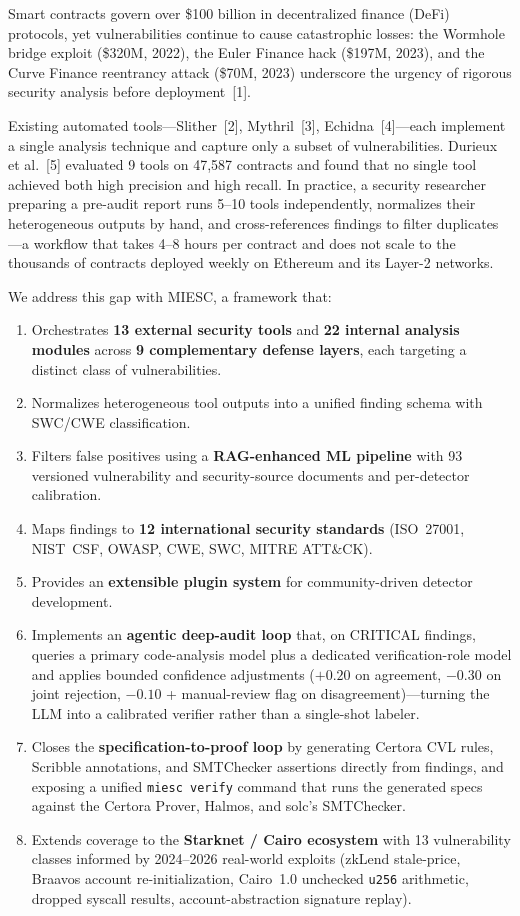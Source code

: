 \documentclass[conference]{IEEEtran}
\begin{document}
Smart contracts govern over \$100 billion in decentralized finance (DeFi) protocols, yet vulnerabilities continue to cause catastrophic losses: the Wormhole bridge exploit (\$320M, 2022), the Euler Finance hack (\$197M, 2023), and the Curve Finance reentrancy attack (\$70M, 2023) underscore the urgency of rigorous security analysis before deployment~[1].

Existing automated tools---Slither~[2], Mythril~[3], Echidna~[4]---each implement a single analysis technique and capture only a subset of vulnerabilities. Durieux et al.~[5] evaluated 9 tools on 47,587 contracts and found that no single tool achieved both high precision and high recall. In practice, a security researcher preparing a pre-audit report runs 5--10 tools independently, normalizes their heterogeneous outputs by hand, and cross-references findings to filter duplicates---a workflow that takes 4--8 hours per contract and does not scale to the thousands of contracts deployed weekly on Ethereum and its Layer-2 networks.

We address this gap with MIESC, a framework that:
\begin{enumerate}
    \item Orchestrates \textbf{13 external security tools} and \textbf{22 internal analysis modules} across \textbf{9 complementary defense layers}, each targeting a distinct class of vulnerabilities.
    \item Normalizes heterogeneous tool outputs into a unified finding schema with SWC/CWE classification.
    \item Filters false positives using a \textbf{RAG-enhanced ML pipeline} with 93 versioned vulnerability and security-source documents and per-detector calibration.
    \item Maps findings to \textbf{12 international security standards} (ISO~27001, NIST~CSF, OWASP, CWE, SWC, MITRE ATT\&CK).
    \item Provides an \textbf{extensible plugin system} for community-driven detector development.
    \item Implements an \textbf{agentic deep-audit loop} that, on CRITICAL findings, queries a primary code-analysis model plus a dedicated verification-role model and applies bounded confidence adjustments ($+0.20$ on agreement, $-0.30$ on joint rejection, $-0.10$ + manual-review flag on disagreement)---turning the LLM into a calibrated verifier rather than a single-shot labeler.
    \item Closes the \textbf{specification-to-proof loop} by generating Certora CVL rules, Scribble annotations, and SMTChecker assertions directly from findings, and exposing a unified \texttt{miesc verify} command that runs the generated specs against the Certora Prover, Halmos, and solc's SMTChecker.
    \item Extends coverage to the \textbf{Starknet / Cairo ecosystem} with 13 vulnerability classes informed by 2024--2026 real-world exploits (zkLend stale-price, Braavos account re-initialization, Cairo~1.0 unchecked \texttt{u256} arithmetic, dropped syscall results, account-abstraction signature replay).
\end{enumerate}
\end{document}
